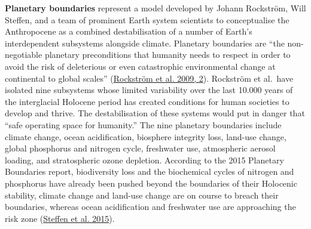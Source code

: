 \documentclass[a4paper, nobind]{templates/ociamthesis}
\begin{document}
\textbf{Planetary boundaries} represent a model developed by Johann Rockström, Will Steffen, and a team of prominent Earth system scientists to conceptualise the Anthropocene as a combined destabilisation of a number of Earth's interdependent subsystems alongside climate. Planetary boundaries are ``the non-negotiable planetary preconditions that humanity needs to respect in order to avoid the risk of deleterious or even catastrophic environmental change at continental to global scales'' (\protect\hyperlink{ref-rockstrom_planetary_2009}{Rockström et al. 2009, 2}). Rockström et al.~have isolated nine subsystems whose limited variability over the last 10.000 years of the interglacial Holocene period has created conditions for human societies to develop and thrive. The destabilisation of these systems would put in danger that ``safe operating space for humanity.'' The nine planetary boundaries include climate change, ocean acidification, biosphere integrity loss, land-use change, global phosphorus and nitrogen cycle, freshwater use, atmospheric aerosol loading, and stratospheric ozone depletion. According to the 2015 Planetary Boundaries report, biodiversity loss and the biochemical cycles of nitrogen and phosphorus have already been pushed beyond the boundaries of their Holocenic stability, climate change and land-use change are on course to breach their boundaries, whereas ocean acidification and freshwater use are approaching the risk zone (\protect\hyperlink{ref-steffen_planetary_2015}{Steffen et al. 2015}).
\end{document}
